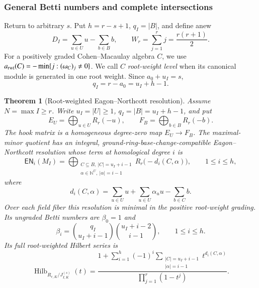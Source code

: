 \documentclass[10pt,fleqn]{article}
\numberwithin{equation}{section}
\newtheorem{theorem}{Theorem}[section]
\newcommand{\Hilb}{\operatorname{Hilb}}
\begin{document}
\subsubsection{General Betti numbers and complete intersections}

Return to arbitrary $s$.  Put $h=r-s+1$, $q_I=|B|$, and define anew
\[
 D_I=\sum_{u\in U}u-\sum_{b\in B}b,\qquad
 W_r=\sum_{j=1}^rj=\frac{r(r+1)}2.
\]
For a positively graded Cohen--Macaulay algebra $C$, we use
$a_{\rm rwt}(C)=-\min\{j:(\omega_C)_j\ne0\}$.
We call $C$ \emph{root-weight level} when its canonical module is generated
in one root weight.  Since $a_0+u_I=s$,
\begin{equation}\label{eq:q-ell-h}
 q_I=r-a_0=u_I+h-1.
\end{equation}

\begin{theorem}[Root-weighted Eagon--Northcott resolution]\label{thm:betti}
Assume $N=\max I\ge r$.  Write $u_I=|U|\ge1$, $q_I=|B|=u_I+h-1$,
and put
\[
 E_U=\bigoplus_{u\in U}R_r(-u),\qquad
 F_B=\bigoplus_{b\in B}R_r(-b).
\]
The hook matrix is a homogeneous degree-zero map $E_U\to F_B$.
The maximal-minor quotient has an integral, ground-ring-base-change-compatible
Eagon--Northcott resolution whose term at homological degree $i$ is
\begin{equation}\label{eq:weighted-EN-terms}
 \mathsf{EN}_i(M_I)=
 \bigoplus_{\substack{C\subseteq B,\ |C|=u_I+i-1\\
                    \alpha\in\mathbb N^U,\ |\alpha|=i-1}}
 R_r\bigl(-d_i(C,\alpha)\bigr),\qquad 1\le i\le h,
\end{equation}
where
\begin{equation}\label{eq:weighted-EN-shifts}
 d_i(C,\alpha)=\sum_{u\in U}u+\sum_{u\in U}\alpha_u u-\sum_{b\in C}b.
\end{equation}
Over each field fiber this resolution is minimal in the positive root-weight grading.
Its ungraded Betti numbers are $\beta_0=1$ and
\begin{equation}\label{eq:betti}
 \beta_i=\binom{q_I}{u_I+i-1}\binom{u_I+i-2}{i-1},\qquad1\le i\le h.
\end{equation}
Its full root-weighted Hilbert series is
\begin{equation}\label{eq:weighted-EN-Hilbert}
 \Hilb_{R_{r,K}/J_{I,K}^{(s)}}(t)=
 \frac{1+\displaystyle\sum_{i=1}^h(-1)^i
       \displaystyle\sum_{\substack{|C|=u_I+i-1\\|\alpha|=i-1}}
       t^{d_i(C,\alpha)}}{\displaystyle\prod_{j=1}^r(1-t^j)}.
\end{equation}

\end{theorem}
\end{document}
